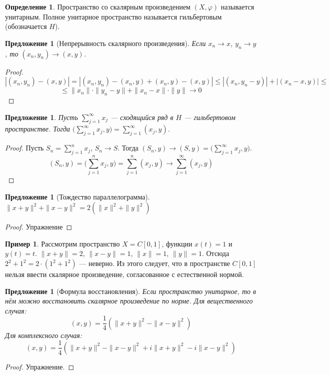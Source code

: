 \documentclass[11pt,openany,a4paper]{scrartcl}
\theoremstyle{plain}
\newtheorem{proposition}[theorem]{Предложение}
\theoremstyle{definition}
\newtheorem{definition}[theorem]{Определение}
\newtheorem{example}[theorem]{Пример}
\begin{document}
\begin{definition}
    Пространство со скалярным произведением $(X, \varphi)$ называется унитарным.
    Полное унитарное пространство называется гильбертовым (обозначается $H$).
\end{definition}

\begin{proposition}[Непрерывность скалярного произведения]
    Если  $x_n \to x$, $y_n \to y$, то $(x_n, y_n) \to (x, y)$.
\end{proposition}
\begin{proof}
    $$
    |(x_n, y_n) - (x, y)| = |(x_n, y_n) - (x_n, y) + (x_n, y) - (x, y)| \leqslant
    |(x_n, y_n - y)| + |(x_n - x, y)| \leqslant
    $$
    $$
    \leqslant \|x_n\| \cdot \|y_n - y\| + \|x_n - x\|\cdot \|y\| \to 0
    $$
\end{proof}

\begin{proposition}
    Пусть $\sum\limits_{j=1}^\infty x_j$ — сходящийся ряд в $H$ — гильбертовом
    пространстве. Тогда $\bigg(\sum\limits_{j=1}^\infty x_j, y\bigg) =
    \sum\limits_{j=1}^\infty (x_j, y)$.
\end{proposition}
\begin{proof}
    Пусть $S_n = \sum\limits_{j=1}^n x_j$, $S_n \to S$. Тогда
    $(S_n, y) \to (S, y) = \bigg(\sum\limits_{j=1}^\infty x_j, y\bigg)$.
    $$
    (S_n, y) = \bigg(\sum\limits_{j=1}^n x_j, y\bigg) =
    \sum\limits_{j=1}^n(x_j, y) \to
    \sum\limits_{j=1}^\infty(x_j, y)
    $$
\end{proof}

\begin{proposition}[Тождество параллелограмма]
    $\|x + y\|^2 + \|x - y\|^2 = 2(\|x\|^2 + \|y\|^2)$
\end{proposition}
\begin{proof}
    Упражнение
\end{proof}

\begin{example}
    Рассмотрим пространство $X = C[0, 1]$, функции $x(t) = 1$ и $y(t) = t$.
    $\|x + y\| = 2$, $\|x - y\| = 1$, $\|x\| = 1$, $\|y\| = 1$. Отсюда
    $2^2 + 1^2 = 2\cdot (1^2 + 1^2)$ — неверно. Из этого следует, что в 
    пространстве $C[0, 1]$ нельзя ввести скалярное произведение, согласованное
    с естественной нормой.
\end{example}

\begin{proposition}[Формула восстановления]
    Если пространство унитарное, то в нём можно восстановить скалярное 
    произведение по норме. Для вещественного случая:
    $$
    (x, y) = \frac{1}{4}(\|x + y\|^2 - \|x - y\|^2)
    $$
    Для комплексного случая:
    $$
    (x, y) = \frac{1}{4}(\|x + y\|^2 - \|x - y\|^2 + i\|x + y\|^2 - i\|x - y\|^2)
    $$
\end{proposition}
\begin{proof}
    Упражнение.
\end{proof}
\end{document}
